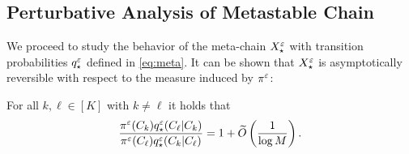 \subsection{Perturbative Analysis of Metastable Chain}

We proceed to study the behavior of the meta-chain $X_\star^\varepsilon$ with transition probabilities $q_\star^\varepsilon$ defined in \eqref{eq:meta}. It can be shown that $X_\star^\varepsilon$ is asymptotically reversible with respect to the measure induced by $\pi^\varepsilon$:

\begin{prop}\label{thm:asymprev}
For all $k,\ell\in[K]$ with $k\neq\ell$ it holds that
\begin{equation*}
\frac{\pi^\varepsilon(C_k)q_\star^\varepsilon(C_\ell|C_k)}{\pi^\varepsilon(C_\ell)q_\star^\varepsilon(C_k|C_\ell)} = 1+ \widetilde{O}\left(\frac{1}{\log M}\right).
\end{equation*}
\end{prop}

